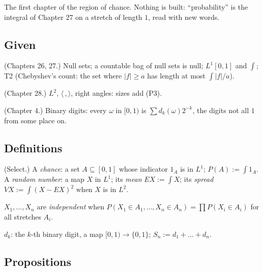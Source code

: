The first chapter of the region of chance. Nothing is built: ``probability'' is the integral of Chapter 27 on a stretch of length $1$, read with new words.

\subsection*{Given}

\begin{lines}
\item[\lab{G1}] (Chapters 26, 27.) Null sets; a countable bag of null sets is null; $L^1[0, 1]$ and $\int$; T2 (Chebyshev's count: the set where $|f| \ge a$ has length at most $\int |f| / a$).
\item[\lab{G2}] (Chapter 28.) $L^2$, $\langle\,,\rangle$, right angles: sizes add (P3).
\item[\lab{G3}] (Chapter 4.) Binary digits: every $\omega$ in $[0, 1)$ is $\sum d_k(\omega) 2^{-k}$, the digits not all $1$ from some place on.
\end{lines}

\subsection*{Definitions}

\begin{lines}
\item[\lab{D1}] (Select.) A \emph{chance}: a set $A \subseteq [0, 1]$ whose indicator $1_A$ is in $L^1$; $P(A) := \int 1_A$. A \emph{random number}: a map $X$ in $L^1$; its \emph{mean} $E X := \int X$; its \emph{spread} $V X := \int (X - EX)^2$ when $X$ is in $L^2$.
\item[\lab{D2}] $X_1, \dots, X_n$ are \emph{independent} when $P(X_1 \in A_1, \dots, X_n \in A_n) = \prod P(X_i \in A_i)$ for all stretches $A_i$.
\item[\lab{D3}] $d_k$: the $k$-th binary digit, a map $[0, 1) \to \{0, 1\}$; $S_n := d_1 + \dots + d_n$.
\end{lines}

\subsection*{Propositions}

